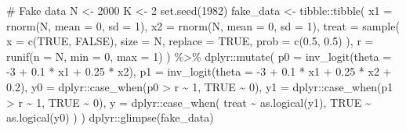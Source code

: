 \documentclass[
  letterpaper,
  DIV=11,
  numbers=noendperiod]{scrreprt}
\newenvironment{Shaded}{\begin{snugshade}}{\end{snugshade}}
\newcommand{\AttributeTok}[1]{\textcolor[rgb]{0.40,0.45,0.13}{#1}}
\newcommand{\CommentTok}[1]{\textcolor[rgb]{0.37,0.37,0.37}{#1}}
\newcommand{\ConstantTok}[1]{\textcolor[rgb]{0.56,0.35,0.01}{#1}}
\newcommand{\DecValTok}[1]{\textcolor[rgb]{0.68,0.00,0.00}{#1}}
\newcommand{\FloatTok}[1]{\textcolor[rgb]{0.68,0.00,0.00}{#1}}
\newcommand{\FunctionTok}[1]{\textcolor[rgb]{0.28,0.35,0.67}{#1}}
\newcommand{\NormalTok}[1]{\textcolor[rgb]{0.00,0.23,0.31}{#1}}
\newcommand{\OtherTok}[1]{\textcolor[rgb]{0.00,0.23,0.31}{#1}}
\newcommand{\SpecialCharTok}[1]{\textcolor[rgb]{0.37,0.37,0.37}{#1}}
\begin{document}
\begin{Shaded}
\begin{Highlighting}[]
\CommentTok{\# Fake data}
\NormalTok{N }\OtherTok{\textless{}{-}} \DecValTok{2000}
\NormalTok{K }\OtherTok{\textless{}{-}} \DecValTok{2}
\FunctionTok{set.seed}\NormalTok{(}\DecValTok{1982}\NormalTok{)}
\NormalTok{fake\_data }\OtherTok{\textless{}{-}}\NormalTok{ tibble}\SpecialCharTok{::}\FunctionTok{tibble}\NormalTok{(}
  \AttributeTok{x1 =} \FunctionTok{rnorm}\NormalTok{(N, }\AttributeTok{mean =} \DecValTok{0}\NormalTok{, }\AttributeTok{sd =} \DecValTok{1}\NormalTok{),}
  \AttributeTok{x2 =} \FunctionTok{rnorm}\NormalTok{(N, }\AttributeTok{mean =} \DecValTok{0}\NormalTok{, }\AttributeTok{sd =} \DecValTok{1}\NormalTok{),}
  \AttributeTok{treat =} \FunctionTok{sample}\NormalTok{(}
    \AttributeTok{x =} \FunctionTok{c}\NormalTok{(}\ConstantTok{TRUE}\NormalTok{, }\ConstantTok{FALSE}\NormalTok{), }\AttributeTok{size =}\NormalTok{ N, }\AttributeTok{replace =} \ConstantTok{TRUE}\NormalTok{,}
    \AttributeTok{prob =} \FunctionTok{c}\NormalTok{(}\FloatTok{0.5}\NormalTok{, }\FloatTok{0.5}\NormalTok{)}
\NormalTok{  ),}
  \AttributeTok{r =} \FunctionTok{runif}\NormalTok{(}\AttributeTok{n =}\NormalTok{ N, }\AttributeTok{min =} \DecValTok{0}\NormalTok{, }\AttributeTok{max =} \DecValTok{1}\NormalTok{)}
\NormalTok{) }\SpecialCharTok{\%\textgreater{}\%}
\NormalTok{  dplyr}\SpecialCharTok{::}\FunctionTok{mutate}\NormalTok{(}
    \AttributeTok{p0 =} \FunctionTok{inv\_logit}\NormalTok{(}\AttributeTok{theta =} \SpecialCharTok{{-}}\DecValTok{3} \SpecialCharTok{+} \FloatTok{0.1} \SpecialCharTok{*}\NormalTok{ x1 }\SpecialCharTok{+} \FloatTok{0.25} \SpecialCharTok{*}\NormalTok{ x2),}
    \AttributeTok{p1 =} \FunctionTok{inv\_logit}\NormalTok{(}\AttributeTok{theta =} \SpecialCharTok{{-}}\DecValTok{3} \SpecialCharTok{+} \FloatTok{0.1} \SpecialCharTok{*}\NormalTok{ x1 }\SpecialCharTok{+} \FloatTok{0.25} \SpecialCharTok{*}\NormalTok{ x2 }\SpecialCharTok{+} \FloatTok{0.2}\NormalTok{),}
    \AttributeTok{y0 =}\NormalTok{ dplyr}\SpecialCharTok{::}\FunctionTok{case\_when}\NormalTok{(p0 }\SpecialCharTok{\textgreater{}}\NormalTok{ r }\SpecialCharTok{\textasciitilde{}} \DecValTok{1}\NormalTok{, }\ConstantTok{TRUE} \SpecialCharTok{\textasciitilde{}} \DecValTok{0}\NormalTok{),}
    \AttributeTok{y1 =}\NormalTok{ dplyr}\SpecialCharTok{::}\FunctionTok{case\_when}\NormalTok{(p1 }\SpecialCharTok{\textgreater{}}\NormalTok{ r }\SpecialCharTok{\textasciitilde{}} \DecValTok{1}\NormalTok{, }\ConstantTok{TRUE} \SpecialCharTok{\textasciitilde{}} \DecValTok{0}\NormalTok{),}
    \AttributeTok{y =}\NormalTok{ dplyr}\SpecialCharTok{::}\FunctionTok{case\_when}\NormalTok{(}
\NormalTok{      treat }\SpecialCharTok{\textasciitilde{}} \FunctionTok{as.logical}\NormalTok{(y1),}
      \ConstantTok{TRUE} \SpecialCharTok{\textasciitilde{}} \FunctionTok{as.logical}\NormalTok{(y0)}
\NormalTok{    )}
\NormalTok{  )}
\NormalTok{dplyr}\SpecialCharTok{::}\FunctionTok{glimpse}\NormalTok{(fake\_data)}
\end{Highlighting}
\end{Shaded}
\end{document}
